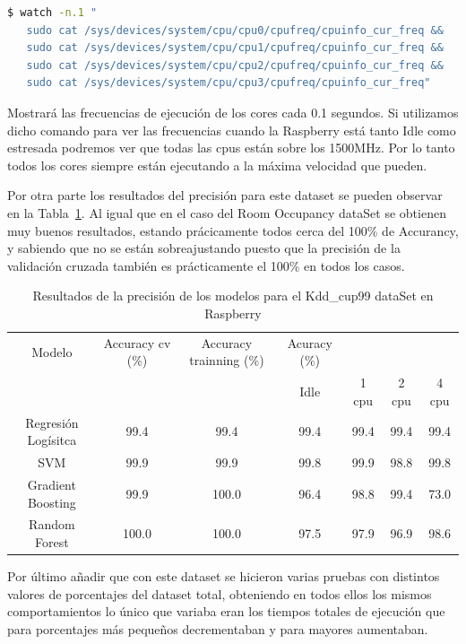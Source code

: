 \documentclass[a4paper, 12pt]{book}
\begin{document}
\begin{lstlisting}[language=bash, showstringspaces=false]
   $ watch -n.1 "
   sudo cat /sys/devices/system/cpu/cpu0/cpufreq/cpuinfo_cur_freq && 
   sudo cat /sys/devices/system/cpu/cpu1/cpufreq/cpuinfo_cur_freq && 
   sudo cat /sys/devices/system/cpu/cpu2/cpufreq/cpuinfo_cur_freq && 
   sudo cat /sys/devices/system/cpu/cpu3/cpufreq/cpuinfo_cur_freq"
\end{lstlisting}

Mostrará las frecuencias de ejecución de los cores cada 0.1 segundos. Si utilizamos dicho comando para ver las frecuencias cuando la Raspberry está tanto Idle como estresada podremos ver que todas las cpus están sobre los 1500MHz. Por lo tanto todos los cores siempre están ejecutando a la máxima velocidad que pueden.

Por otra parte los resultados del precisión para este dataset se pueden observar en la Tabla~\ref{tab:acc_Kddraspberry}. Al igual que en el caso del Room Occupancy dataSet se obtienen muy buenos resultados, estando prácicamente todos cerca del 100\% de Accurancy, y sabiendo que no se están sobreajustando puesto que la precisión de la validación cruzada también es prácticamente el 100\% en todos los casos.

\begin{table}[]
\begin{adjustbox}{width=\textwidth}
\centering
    \begin{tabular}{c  c  c  c  c  c  c}
    \hline
    Modelo & Accuracy cv (\%) & Accuracy trainning (\%) & Acuracy (\%) & & & \\
    \cline{4-7}
     &  &   &  Idle & 1 cpu & 2 cpu & 4 cpu \\
     \hline
     Regresión Logísitca & 99.4 & 99.4 & 99.4 & 99.4 & 99.4 & 99.4\\
     SVM & 99.9 & 99.9 & 99.8 & 99.9 & 98.8 & 99.8\\
     Gradient Boosting & 99.9 & 100.0 & 96.4 & 98.8 & 99.4 & 73.0\\
     Random Forest & 100.0 & 100.0 & 97.5 & 97.9 & 96.9 & 98.6\\
    \hline
    \end{tabular}
\end{adjustbox}
\caption{Resultados de la precisión de los modelos para el Kdd\_cup99 dataSet en Raspberry}
\label{tab:acc_Kddraspberry}
\end{table}

Por último añadir que con este dataset se hicieron varias pruebas con distintos valores de porcentajes del dataset total, obteniendo en todos ellos los mismos comportamientos lo único que variaba eran los tiempos totales de ejecución que para porcentajes más pequeños decrementaban y para mayores aumentaban.
\end{document}
